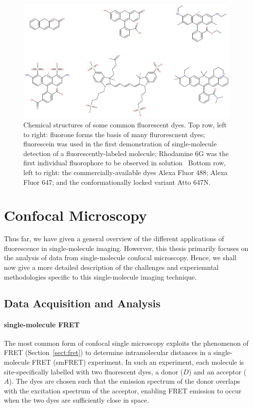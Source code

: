 \begin{figure}
	\begin{center}
	\includegraphics*[clip=true, width=5in]{introduction/dyes.pdf}
	\caption{Chemical structures of some common fluorescent dyes. Top row, left to right: fluorone forms the basis of many flurorescnent dyes; fluorescein was used in the first demonstration of single-molecule detection of a fluorescently-labeled molecule; Rhodamine 6G was the first individual fluorophore to be observed in solution~\cite{Shera1990} Bottom row, left to right: the commercially-available dyes Alexa Fluor 488; Alexa Fluor 647; and the conformationally locked variant Atto 647N.}
	\label{fig:dyes}
	\end{center}
\end{figure}


\section{Confocal Microscopy}
Thus far, we have given a general overview of the different applications of fluorescence in single-molecule imaging. Howerver, this thesis primarily focuses on the analysis of data from single-molecule confocal microscopy. Hence, we shall now give a more detailed description of the challenges and experiemntal methodologies specific to this single-molecule imaging technique.

\subsection{Data Acquisition and Analysis}
\paragraph{single-molecule FRET}
\label{par:FRET}
The most common form of confocal single microscopy exploits the phenomenon of FRET (Section~\ref{sect:fret}) to determine intramolecular distances in a single-molecule FRET (smFRET) experiment. In such an experiment, each molecule is site-specifically labelled with two fluorescent dyes, a donor ($D$) and an acceptor ($A$). The dyes are chosen such that the emission spectrum of the donor overlaps with the excitation spectrum of the acceptor, enabling FRET emission to occur when the two dyes are sufficiently close in space. 

